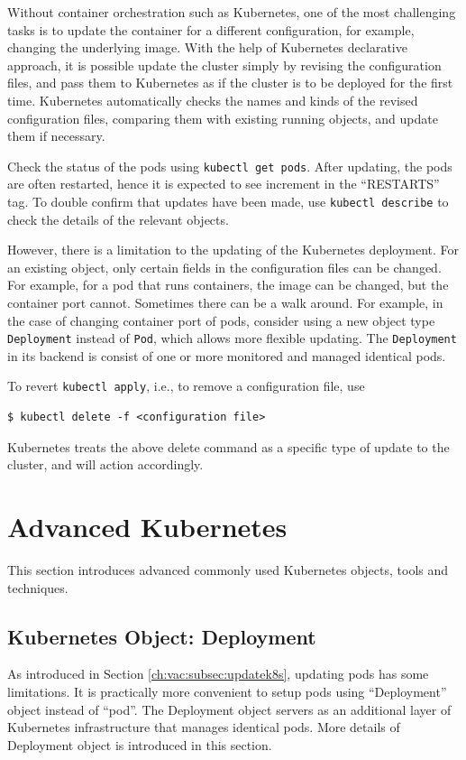 Without container orchestration such as Kubernetes, one of the most challenging tasks is to update the container for a different configuration, for example, changing the underlying image. With the help of Kubernetes declarative approach, it is possible update the cluster simply by revising the configuration files, and pass them to Kubernetes as if the cluster is to be deployed for the first time. Kubernetes automatically checks the names and kinds of the revised configuration files, comparing them with existing running objects, and update them if necessary.

Check the status of the pods using \verb|kubectl get pods|. After updating, the pods are often restarted, hence it is expected to see increment in the ``RESTARTS'' tag. To double confirm that updates have been made, use \verb|kubectl describe| to check the details of the relevant objects.

However, there is a limitation to the updating of the Kubernetes deployment. For an existing object, only certain fields in the configuration files can be changed. For example, for a pod that runs containers, the image can be changed, but the container port cannot. Sometimes there can be a walk around. For example, in the case of changing container port of pods, consider using a new object type \verb|Deployment| instead of \verb|Pod|, which allows more flexible updating. The \verb|Deployment| in its backend is consist of one or more monitored and managed identical pods.

To revert \verb|kubectl apply|, i.e., to remove a configuration file, use
\begin{lstlisting}
$ kubectl delete -f <configuration file>
\end{lstlisting}
Kubernetes treats the above delete command as a specific type of update to the cluster, and will action accordingly.

\section{Advanced Kubernetes}

This section introduces advanced commonly used Kubernetes objects, tools and techniques.

\subsection{Kubernetes Object: Deployment} \label{ch:vac:subsec:deployment}

As introduced in Section \ref{ch:vac:subsec:updatek8s}, updating pods has some limitations. It is practically more convenient to setup pods using ``Deployment'' object instead of ``pod''. The Deployment object servers as an additional layer of Kubernetes infrastructure that manages identical pods. More details of Deployment object is introduced in this section.

